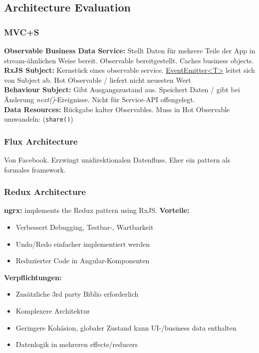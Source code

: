 \subsection{Architecture Evaluation}

\subsubsection{MVC+S}
\textbf{Observable Business Data Service:}
Stellt Daten für mehrere Teile der App in stream-ähnlichen Weise bereit. Observable bereitgestellt. Caches business objects.\\
\textbf{RxJS Subject:}
Kernstück eines observable service.
\underline{EventEmitter<T>}
leitet sich von Subject ab. Hot Observable / liefert nicht neuesten Wert\\
\textbf{Behaviour Subject:}
Gibt Ausgangszustand aus. Speichert Daten / gibt bei Änderung \textit{next()}-Ereignisse. Nicht für Service-API offengelegt.\\
\textbf{Data Resources:}
Rückgabe kalter Observables. Muss in Hot Observable umwandeln: (\texttt{\tiny share()})

\subsubsection{Flux Architecture}
Von Facebook. Erzwingt unidirektionalen Datenfluss. Eher ein pattern als formales framework.

\subsubsection{Redux Architecture}
\textbf{ngrx:} implements the Redux pattern using RxJS.
\textbf{Vorteile:}
\begin{itemize}
    \item Verbessert Debugging, Testbar-, Wartbarkeit
    \item Undo/Redo einfacher implementiert werden
    \item Reduzierter Code in Angular-Komponenten
\end{itemize}
\textbf{Verpflichtungen:}
\begin{itemize}
    \item Zusätzliche 3rd party Biblio erforderlich
    \item Komplexere Architektur
    \item Geringere Kohäsion, globaler Zustand kann UI-/business data enthalten
    \item Datenlogik in mehreren effects/reducers
\end{itemize}

